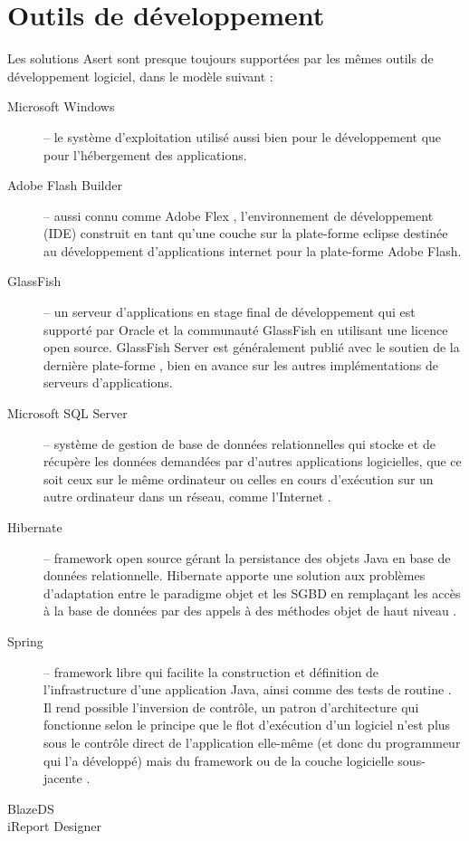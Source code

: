 \section{Outils de développement}

Les solutions Asert sont presque toujours supportées par les mêmes outils de développement logiciel, dans le modèle suivant :
\begin{description}
\item[Microsoft Windows] -- le système d'exploitation utilisé aussi bien pour le développement que pour l'hébergement des applications.
\item[Adobe Flash Builder] -- aussi connu comme Adobe Flex \cite{flex}, l'environnement de développement (IDE) construit en tant qu'une couche sur la plate-forme \Gls{eclipse} destinée au développement d'applications internet pour la plate-forme Adobe Flash.
\item[GlassFish] -- un serveur d'applications en stage final de développement qui est supporté par Oracle et la communauté GlassFish en utilisant une licence open source. GlassFish Server \cite{glassfish} est généralement publié avec le soutien de la dernière plate-forme \cite{jee}, bien en avance sur les autres implémentations de serveurs d'applications.
\item[Microsoft SQL Server] -- système de gestion de base de données relationnelles qui stocke et de récupère les données demandées par d'autres applications logicielles, que ce soit ceux sur le même ordinateur ou celles en cours d'exécution sur un autre ordinateur dans un réseau, comme l'Internet \cite{sql-server}.
\item[Hibernate] -- framework open source gérant la persistance des objets Java en base de données relationnelle. Hibernate apporte une solution aux problèmes d'adaptation entre le paradigme objet et les \gls{SGBD} en remplaçant les accès à la base de données par des appels à des méthodes objet de haut niveau \cite{hibernate}.
\item[Spring] -- framework libre qui facilite la construction et définition de l'infrastructure d'une application Java, ainsi comme des tests de routine \cite{spring}. Il rend possible l'inversion de contrôle, un patron d'architecture qui fonctionne selon le principe que le flot d'exécution d'un logiciel n'est plus sous le contrôle direct de l'application elle-même (et donc du programmeur qui l'a développé) mais du framework ou de la couche logicielle sous-jacente \cite{wiki-ioc}.
\item[BlazeDS]
\item[iReport Designer]
\end{description}


